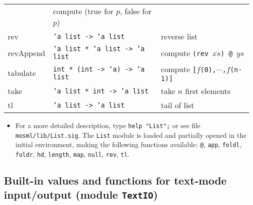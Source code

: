 \documentclass[fleqn,a4paper]{article}
\begin{document}
\begin{tabular}{@{\tt\ \ }lll}
        &  compute (true for $p$, false for $p$)\\
rev         & {\tt 'a list -> 'a list}
        & reverse list\\
revAppend   & {\tt 'a list * 'a list -> 'a list}
        & compute {\tt (rev $xs$) @ $ys$}\\ 
tabulate    & {\tt int * (int -> 'a) -> 'a list}
        & compute {\tt [$f$(0),$\cdots$,$f$(n-1)]}\\
take    & {\tt 'a list * int -> 'a list}
        & take $n$ first elements\\
tl          & {\tt 'a list -> 'a list}
        & tail of list\\\hline
\end{tabular}

\begin{itemize}

\item For a more detailed description, type {\tt help "List";} or see
  file {\tt mosml/lib/List.sig}.  The {\tt List} module is loaded and
  partially opened in the initial environment, making the following
  functions available: {\tt @}, {\tt app}, {\tt foldl}, {\tt foldr},
  {\tt hd}, {\tt length}, {\tt map}, {\tt null}, {\tt rev}, {\tt tl}.
\end{itemize}


\subsection*{Built-in values and functions for text-mode input/output (module
  {\tt TextIO})}
\end{document}
